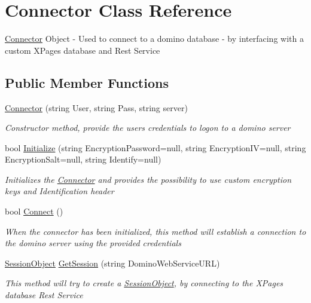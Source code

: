 \hypertarget{class_connector}{}\section{Connector Class Reference}
\label{class_connector}


\mbox{\hyperlink{class_connector}{Connector}} Object -\/ Used to connect to a domino database -\/ by interfacing with a custom X\+Pages database and Rest Service  


\subsection*{Public Member Functions}
\begin{DoxyCompactItemize}
\item 
\mbox{\hyperlink{class_connector_a259c6d94252479cc3028038ebbaa7dc8}{Connector}} (string User, string Pass, string server)
\begin{DoxyCompactList}\small\item\em Constructor method, provide the users credentials to logon to a domino server \end{DoxyCompactList}\item 
bool \mbox{\hyperlink{class_connector_a376c1ed70efd33d0bb18bb36e5cf076e}{Initialize}} (string Encryption\+Password=null, string Encryption\+IV=null, string Encryption\+Salt=null, string Identify=null)
\begin{DoxyCompactList}\small\item\em Initializes the \mbox{\hyperlink{class_connector}{Connector}} and provides the possibility to use custom encryption keys and Identification header \end{DoxyCompactList}\item 
bool \mbox{\hyperlink{class_connector_a0dcf8f969c37c4306c567417a872329a}{Connect}} ()
\begin{DoxyCompactList}\small\item\em When the connector has been initialized, this method will establish a connection to the domino server using the provided credentials \end{DoxyCompactList}\item 
\mbox{\hyperlink{class_session_object}{Session\+Object}} \mbox{\hyperlink{class_connector_a5d089c1639f255966f00b2b05add0993}{Get\+Session}} (string Domino\+Web\+Service\+U\+RL)
\begin{DoxyCompactList}\small\item\em This method will try to create a \mbox{\hyperlink{class_session_object}{Session\+Object}}, by connecting to the X\+Pages database Rest Service \end{DoxyCompactList}\end{DoxyCompactItemize}
